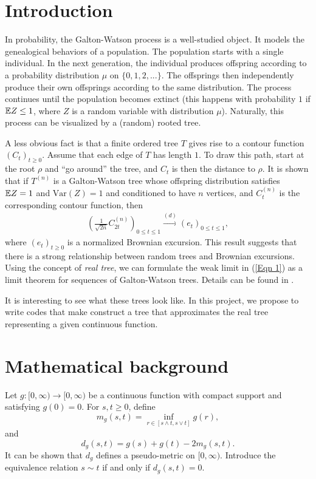 \documentclass[12pt,oneside]{amsart}
\theoremstyle{plain}
\theoremstyle{definition}
\theoremstyle{remark}
\begin{document}
\section{Introduction}
In probability, the Galton-Watson process is a well-studied object. It models the
genealogical behaviors of a population. The population starts with a single individual.
In the next generation, the individual produces offspring according to a probability
distribution $\mu$ on $\{0, 1, 2, ...\}$. The offsprings then independently produce their
own offsprings according to the same distribution. The process continues until the population
becomes extinct (this happens with probability $1$ if ${\Bbb E} Z \leq 1$, where $Z$
is a random variable with distribution $\mu$). Naturally, this process can be
visualized by a (random) rooted tree. 

A less obvious fact is that a finite ordered tree $T$ gives rise to a contour function
$(C_t)_{t \geq 0}$. Assume that each edge of $T$ has length $1$. To draw this path, start
at the root $\rho$ and ``go around'' the tree, and $C_t$ is then the distance to $\rho$.
It is shown that if $T^{(n)}$ is a Galton-Watson tree whose offspring distribution satisfies
${\Bbb E}Z = 1$ and ${\mathrm{Var}}(Z) = 1$ and conditioned to have $n$ vertices,
and $C^{(n)}_t$ is the corresponding contour function, then
\begin{eqnarray} \label{Eqn 1}
\left(\frac{1}{\sqrt{2n}}C^{(n)}_{2t}\right)_{0 \leq t \leq 1} \overset{(d)}{\rightarrow} (e_t)_{0 \leq t \leq 1},
\end{eqnarray}
where $(e_t)_{t \geq 0}$ is a normalized Brownian excursion. This result suggests that
there is a strong relationship between random trees and Brownian excursions.
Using the concept of {\it real tree}, we can formulate the weak limit in (\ref{Eqn 1}) as a 
limit theorem for sequences of Galton-Watson trees. Details can be found in \cite{LG}.

It is interesting to see what these trees look like. In this project, we propose to write
codes that make construct a tree that approximates the real tree representing a given
continuous function.

\section{Mathematical background}
Let $g: [0, \infty) \rightarrow [0, \infty)$ be a continuous function with compact support
and satisfying $g(0) = 0$. For $s, t \geq 0$, define
\[
m_g(s, t) = \inf_{r \in [s \wedge t, s \vee t]} g(r),
\]
and
\[
d_g(s, t) = g(s) + g(t) - 2m_g(s, t).
\]
It can be shown that $d_g$ defines a pseudo-metric on $[0, \infty)$. Introduce the equivalence
relation $s \sim t$ if and only if $d_g(s, t) = 0$.
\end{document}
